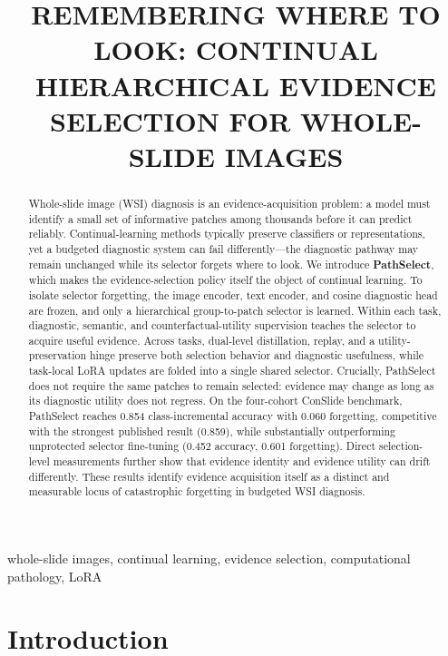 \documentclass{article}
\title{REMEMBERING WHERE TO LOOK: CONTINUAL HIERARCHICAL EVIDENCE SELECTION FOR WHOLE-SLIDE IMAGES}
\begin{document}
\ninept
\maketitle

\begin{abstract}
Whole-slide image (WSI) diagnosis is an evidence-acquisition problem: a model must identify a small set of informative patches among thousands before it can predict reliably. Continual-learning methods typically preserve classifiers or representations, yet a budgeted diagnostic system can fail differently---the diagnostic pathway may remain unchanged while its selector forgets where to look. We introduce \textbf{PathSelect}, which makes the evidence-selection policy itself the object of continual learning. To isolate selector forgetting, the image encoder, text encoder, and cosine diagnostic head are frozen, and only a hierarchical group-to-patch selector is learned. Within each task, diagnostic, semantic, and counterfactual-utility supervision teaches the selector to acquire useful evidence. Across tasks, dual-level distillation, replay, and a utility-preservation hinge preserve both selection behavior and diagnostic usefulness, while task-local LoRA updates are folded into a single shared selector. Crucially, PathSelect does not require the same patches to remain selected: evidence may change as long as its diagnostic utility does not regress. On the four-cohort ConSlide benchmark, PathSelect reaches 0.854 class-incremental accuracy with 0.060 forgetting, competitive with the strongest published result (0.859), while substantially outperforming unprotected selector fine-tuning (0.452 accuracy, 0.601 forgetting). Direct selection-level measurements further show that evidence identity and evidence utility can drift differently. These results identify evidence acquisition itself as a distinct and measurable locus of catastrophic forgetting in budgeted WSI diagnosis.
\end{abstract}

\begin{keywords}
whole-slide images, continual learning, evidence selection, computational pathology, LoRA
\end{keywords}

\section{Introduction}
\label{sec:intro}
\end{document}
